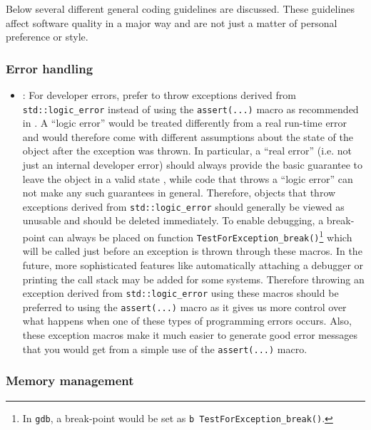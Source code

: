 Below several different general coding guidelines are discussed.  These
guidelines affect software quality in a major way and are not just a matter of
personal preference or style.

%
\subsubsection{Error handling}
%


\begin{itemize}


{}\item\GCGTestForException: For developer errors, prefer to throw exceptions
derived from {}\texttt{std\-::logic\-\_error} instead of using the
{}\texttt{assert(...)}  macro as recommended in {}\cite[Item
68]{C++CodingStandards05}.  A ``logic error'' would be treated differently
from a real run-time error and would therefore come with different assumptions
about the state of the object after the exception was thrown.  In particular,
a ``real error'' (i.e. not just an internal developer error) should always
provide the basic guarantee to leave the object in a valid state {}\cite[Item
71]{C++CodingStandards05}, while code that throws a ``logic error'' can not
make any such guarantees in general.  Therefore, objects that throw exceptions
derived from {}\texttt{std\-::logic\-\_error} should generally be viewed as
unusable and should be deleted immediately.  To enable debugging, a break-point
can always be placed on function
{}\texttt{Test\-For\-Exception\-\_break()}\footnote{In {}\texttt{gdb}, a
break-point would be set as {}\texttt{b Test\-For\-Exception\-\_break()}.} 
which will be called just before an exception is thrown through these macros.
In the future, more sophisticated features like automatically attaching a
debugger or printing the call stack may be added for some systems.  Therefore
throwing an exception derived from {}\texttt{std\-::logic\-\_error} using
these macros should be preferred to using the {}\texttt{assert(...)} macro as
it gives us more control over what happens when one of these types of
programming errors occurs.  Also, these exception macros make it much easier
to generate good error messages that you would get from a simple use of the
{}\texttt{assert(...)} macro.


\end{itemize}


%
\subsubsection{Memory management}
%


